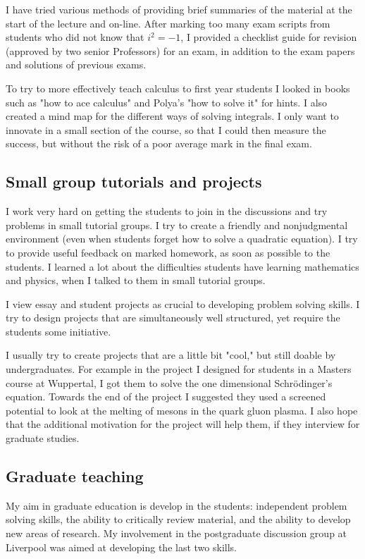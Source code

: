 \documentclass[12pt]{article}
\begin{document}
I have tried various methods of providing brief
summaries of the material at the start of the lecture
and on-line. After marking too many exam scripts from
students who did not know that $i^2 = -1$, I provided
a checklist guide for revision (approved by two senior
Professors) for an exam, 
in addition to the exam papers and solutions of previous exams.

To try to more effectively teach calculus to first year students I
looked in books such as "how to ace calculus" and Polya's "how to
solve it" for hints. I also created a mind map for the different ways
of solving integrals. I only want to innovate in a small section of
the course, so that I could then measure the success, but without the risk
of a poor average mark in the final exam.

\subsection{Small group tutorials and projects}


I work very hard on getting the students to join in the discussions
and try problems in small tutorial groups. I try to create
a friendly and nonjudgmental environment (even when
students forget how to solve a quadratic equation).
I try to provide useful feedback on marked homework,
as soon as possible to the students. I learned a lot
about the difficulties students have learning mathematics
and physics, when I talked to them in small tutorial
groups.

I view essay and student projects as crucial to developing
problem solving skills. I try to design projects
that are simultaneously well structured, yet require
the students some initiative.

I usually try to create projects
that are a little bit "cool," but still doable by undergraduates.
For example in the project I designed for students
in a Masters course at Wuppertal, I got them to solve
the one dimensional Schr\"{o}dinger's equation. Towards the end
of the project I suggested they used a screened potential
to look at the melting of mesons in the quark gluon
plasma. I also hope that the additional motivation for the
project will help them,
if they interview for graduate studies.

\subsection{Graduate teaching}

My aim in graduate education is develop in the students:
independent problem solving skills, 
the ability to critically review material, and 
the ability to develop new areas of research. My 
involvement in the postgraduate discussion group at Liverpool
was aimed at developing the last two skills.
\end{document}

